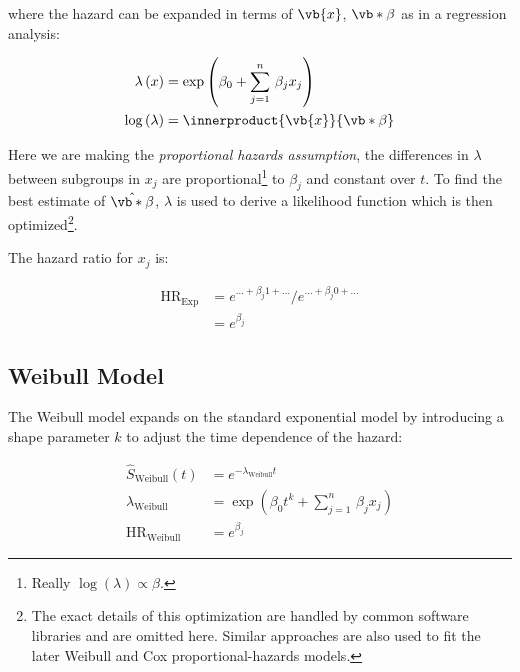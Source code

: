 \noindent where the hazard can be expanded in terms of $\vb{x}$, $\vb*{\beta}$ as in a regression analysis:

\begin{equation}\label{eq:survival:exp_lambda}
\begin{aligned}
\lambda\left(x\right) &= \exp\left(\beta_{0} + \sum_{j=1}^{n}\, \beta_{j} x_{j}\right) \\
\log\left(\lambda\right) &= \innerproduct{\vb{x}}{\vb*{\beta}}
\end{aligned}
\end{equation}

\noindent Here we are making the {\em proportional hazards assumption},
\ie the differences in $\lambda$ between subgroups in $x_{j}$
are proportional\footnote{Really $\log\left(\lambda\right) \propto \beta$.} to $\beta_{j}$
and constant over $t$.
To find the best estimate of $\hat{\vb*{\beta}}$,
$\lambda$ is used to derive a likelihood function which is
then optimized\footnote{The exact details of this optimization
are handled by common software libraries and are omitted here.
Similar approaches are also used to fit the later Weibull and Cox proportional-hazards models.}.

The hazard ratio for $x_{j}$ is:

\begin{equation}\label{eq:survival:exp_HR}
\begin{aligned}
\text{HR}_{\text{Exp}} &= e^{\ldots+\beta_{j} 1+\ldots} / e^{\ldots+\beta_{j} 0+\ldots} \\
&= e^{\beta_{j}}
\end{aligned}
\end{equation}

\subsection{Weibull Model}
\label{survival:weibull}

The Weibull model expands on the standard exponential model
by introducing a shape parameter $k$ to adjust the time dependence of the hazard:

\begin{equation}\label{eq:survival:weibull}
\begin{aligned}
\hat{S}_{\text{Weibull}}\left(t\right) &= e^{-\lambda_{\text{Weibull}} t} \\
\lambda_{\text{Weibull}} &= \exp\left(\beta_{0} t^{k} + \sum_{j=1}^{n}\, \beta_{j} x_{j}\right) \\
\text{HR}_{\text{Weibull}} &= e^{\beta_{j}}
\end{aligned}
\end{equation}

